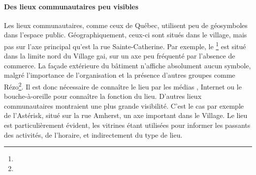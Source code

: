 \paragraph{Des lieux communautaires peu visibles}
Les lieux communautaires, comme ceux de Québec, utilisent peu de géosymboles dans l'espace public.
Géographiquement, ceux-ci sont situés dans le village, mais pas sur l'axe principal qu'est la rue Sainte-Catherine.
Par exemple, le \ccglm{}\footnote{} est situé dans la limite nord du Village gai, sur un axe peu fréquenté par l'absence de commerce.
La façade extérieure du bâtiment n'affiche absolument aucun symbole, malgré l'importance de l'organisation et la présence d'autres groupes \lgbt{} comme Rézo\footnote{}.
Il est donc nécessaire de connaître le lieu par les médias \lgbt{}, Internet ou le bouche-à-oreille pour connaître la fonction du lieu.
D'autres lieux communautaires montraient une plus grande visibilité.
C'est le cas par exemple de l'Astérisk, situé sur la rue Amherst, un axe important dans le Village.
Le lieu est particulièrement évident, les vitrines étant utilisées pour informer les passants des activités, de l'horaire, et indirectement du type de lieu.


